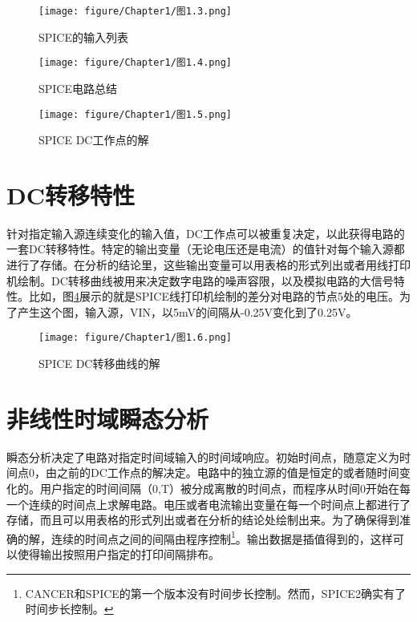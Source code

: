 \begin{figure}[htbp]
\small
    \centering
    \texttt{[image: figure/Chapter1/图1.3.png]}
    \caption{SPICE的输入列表}
    \label{图1.3}
\end{figure}

\begin{figure}[htbp]
\small
    \centering
    \texttt{[image: figure/Chapter1/图1.4.png]}
    \caption{SPICE电路总结}
    \label{图1.4}
\end{figure}

\begin{figure}[htbp]
\small
    \centering
    \texttt{[image: figure/Chapter1/图1.5.png]}
    \caption{SPICE DC工作点的解}
    \label{图1.5}
\end{figure}

\section{DC转移特性}
针对指定输入源连续变化的输入值，DC工作点可以被重复决定，以此获得电路的一套DC转移特性。特定的输出变量（无论电压还是电流）的值针对每个输入源都进行了存储。在分析的结论里，这些输出变量可以用表格的形式列出或者用线打印机绘制。DC转移曲线被用来决定数字电路的噪声容限，以及模拟电路的大信号特性。比如，图\ref{图1.6}展示的就是SPICE线打印机绘制的差分对电路的节点5处的电压。为了产生这个图，输入源，VIN，以5mV的间隔从-0.25V变化到了0.25V。

\begin{figure}[htbp]
\small
    \centering
    \texttt{[image: figure/Chapter1/图1.6.png]}
    \caption{SPICE DC转移曲线的解}
    \label{图1.6}
\end{figure}

\section{非线性时域瞬态分析}
瞬态分析决定了电路对指定时间域输入的时间域响应。初始时间点，随意定义为时间点0，由之前的DC工作点的解决定。电路中的独立源的值是恒定的或者随时间变化的。用户指定的时间间隔（0,T）被分成离散的时间点，而程序从时间0开始在每一个连续的时间点上求解电路。电压或者电流输出变量在每一个时间点上都进行了存储，而且可以用表格的形式列出或者在分析的结论处绘制出来。为了确保得到准确的解，连续的时间点之间的间隔由程序控制\footnote{CANCER和SPICE的第一个版本没有时间步长控制。然而，SPICE2确实有了时间步长控制。}。输出数据是插值得到的，这样可以使得输出按照用户指定的打印间隔排布。

